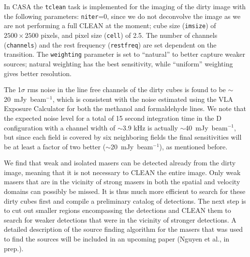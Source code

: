 \documentclass{aa}
\begin{document}
In CASA the \texttt{tclean} task is implemented for the imaging of the dirty image with the following parameters: \texttt{niter}=0, since we do not  deconvolve the image as we are not performing a full CLEAN at the moment; cube size (\texttt{imsize}) of $2500\times2500$ pixels, and  pixel size (\texttt{cell}) of 2.5\arcsec. The number of channels (\texttt{channels}) and the rest frequency (\texttt{restfreq}) are set dependent on the transition. The \texttt{weighting} parameter is set to ``natural'' to  better   capture weaker sources;  natural weighting has the best sensitivity, while ``uniform'' weighting gives better resolution.

The 1$\sigma$ rms noise in the line free channels of the dirty cubes is found to be $\sim$20~mJy~beam$^{-1}$, which is consistent with the noise estimated using the VLA Exposure Calculator for both the methanol and formaldehyde lines. We note that the expected noise level 
for a total of 15 second integration time in the D configuration with a channel width 
of $\sim$3.9 kHz is actually $\sim$40~mJy~beam$^{-1}$, but
since each field is covered by six neighboring fields the final sensitivities will be
at least a factor of two better ($\sim$20~mJy~beam$^{-1}$), as mentioned before.

We find that weak and isolated masers can be detected already from the dirty image, meaning
that it is not necessary to CLEAN the entire image. Only weak masers that are in the vicinity
of strong masers in both the spatial and velocity domains can possibly be missed. 
It is thus much more efficient  to search for these dirty cubes first and compile a 
preliminary catalog of detections. The next step is to cut out smaller regions encompassing
the detections and CLEAN them to search for weaker detections that were in the vicinity
of stronger detections. A detailed description of the source finding algorithm for the masers that was used to find the sources will be included in an upcoming paper (Nguyen et al., in prep.).
\end{document}
